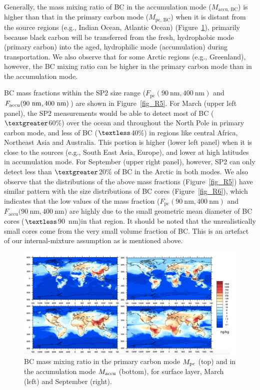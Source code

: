 \documentclass[12pt, fullpage]{uiucthesis2009_2}
\begin{document}
	
	Generally, the mass mixing ratio of BC in the accumulation mode ($M_{\text{accu, BC}}$) is higher than that in the primary carbon mode ($M_{\text{pc, BC}}$) when it is distant from the source regions (e.g., Indian Ocean, Atlantic Ocean) (Figure~\ref{fig_R4}), primarily because black carbon will be transferred from the fresh, hydrophobic mode (primary carbon) into the aged, hydrophilic mode (accumulation) during transportation. We also observe that for some Arctic regions (e.g., Greenland), however, the BC mixing ratio can be higher in the primary carbon mode than in the accumulation mode.
	
	BC mass fractions within the SP2 size range ($F_{\text{pc}}(90~\text{nm}, 400~\text{nm})$ and
	$F_{\text{accu}}(90~\rm nm, 400~\rm nm)$) are shown in Figure~\ref{fig_R5}. For March
	(upper left panel), the SP2 measurements would be able to detect most of BC ($\textgreater$60$\%$) over the ocean and throughout the North Pole in primary carbon mode, and less of BC ($\textless$40$\%$) in regions like central Africa, Northeast Asia and Australia. This portion is higher (lower left panel) when it is close to the sources (e.g., South East Asia, Europe), and lower at high latitudes in accumulation mode. For September
	(upper right panel), however, SP2 can only detect less than $\textgreater$20$\%$ of BC in the Arctic in both modes. We also observe that the distributions of the above mass fractions (Figure~\ref{fig_R5}) have similar pattern with the size distributions of BC cores (Figure~\ref{fig_R6}), which indicates that the low values of the mass fraction ($F_{\text{pc}}(90~\text{nm}, 400~\text{nm})$ and $F_{\text{accu}}(90~\text{nm}, 400~\text{nm}$) are highly due to the small geometric mean diameter of BC cores ($\textless$90~nm)in that region. It should be noted that the unrealistically small cores come from the very small volume fraction of BC. This is an artefact of our internal-mixture assumption as is mentioned above. 
	\begin{figure}[h] 
		\begin{center}
			\includegraphics[width = 1\textwidth]{Rplot01}
			\caption[BC mass mixing ratio in the primary carbon mode $M_{\rm pc}$ (top) and in the accumulation mode $M_{\rm accu}$ (bottom), for surface layer, March (left) and September (right).]{\label{fig_R4}BC mass mixing ratio in the primary carbon mode $M_{\rm pc}$ (top) and in the accumulation mode $M_{\rm accu}$ (bottom), for surface layer, March (left) and September (right).}
		\end{center}
	\end{figure}
	
\end{document}

